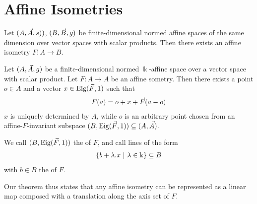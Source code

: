 \section{Affine Isometries}
\begin{theorem}
	Let $(A, \vec{A}, s))$, $(B, \vec{B}, g)$ be finite-dimensional normed affine spaces of the same dimension over vector spaces with scalar products. Then there exists an affine isometry $F : A \to B$.
\end{theorem}
\begin{theorem}
	Let $(A, \vec{A}, g)$ be a finite-dimensional normed $\Bbbk$-affine space over a vector space with scalar product. Let $F : A \to A$ be an affine sometry. Then there exists a point $o \in A$ and a vector $x \in \textnormal{Eig}(\vec{F}, 1)$ such that
	\begin{align*}
		F(a) = o + x + \vec{F}(a - o)
	\end{align*}
	$x$ is uniquely determined by $A$, while $o$ is an arbitrary point chosen from an affine-$F$-invariant subspace $(B, \textnormal{Eig}(\vec{F}, 1)) \subseteq (A, \vec{A})$. 
\end{theorem}
\begin{definition}
	We call $(B, \textnormal{Eig}(\vec{F}, 1))$ the  of $F$, and call lines of the form
	\begin{align*}
		\qty{b + \lambda.x ~\middle|~\lambda \in \Bbbk} \subseteq B
	\end{align*}
	with $b \in B$ the
	 of $F$.
\end{definition}
Our theorem thus states that any affine isometry can be represented as a linear map composed with a translation along the axis set of $F$. 

\iffalse
